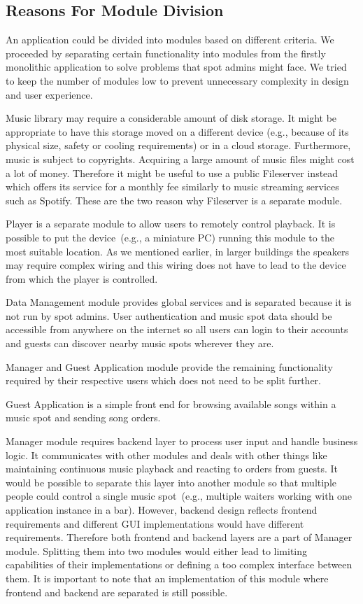 \subsection{Reasons For Module Division}

An application could be divided into modules based on different criteria. We proceeded by separating certain functionality into modules from the firstly monolithic application to solve problems that spot admins might face. We tried to keep the number of modules low to prevent unnecessary complexity in design and user experience.
\par
Music library may require a considerable amount of disk storage. It might be appropriate to have this storage moved on a different device (e.g., because of its physical size, safety or cooling requirements) or in a cloud storage. Furthermore, music is subject to copyrights. Acquiring a large amount of music files might cost a lot of money. Therefore it might be useful to use a public Fileserver instead which offers its service for a monthly fee similarly to music streaming services such as Spotify. These are the two reason why Fileserver is a separate module.
\par
Player is a separate module to allow users to remotely control playback. It is possible to put the device~(e.g., a miniature PC) running this module to the most suitable location. As we mentioned earlier, in larger buildings the speakers may require complex wiring and this wiring does not have to lead to the device from which the player is controlled.
\par
Data Management module provides global services and is separated because it is not run by spot admins. User authentication and music spot data should be accessible from anywhere on the internet so all users can login to their accounts and guests can discover nearby music spots wherever they are.
\par
Manager and Guest Application module provide the remaining functionality required by their respective users which does not need to be split further.
\par
Guest Application is a simple front end for browsing available songs within a music spot and sending song orders.
\par
Manager module requires backend layer to process user input and handle business logic. It communicates with other modules and deals with other things like maintaining continuous music playback and reacting to orders from guests. It would be possible to separate this layer into another module so that multiple people could control a single music spot~(e.g., multiple waiters working with one application instance in a bar). However, backend design reflects frontend requirements and different GUI implementations would have different requirements. Therefore both frontend and backend layers are a part of Manager module. Splitting them into two modules would either lead to limiting capabilities of their implementations or defining a too complex interface between them. It is important to note that an implementation of this module where frontend and backend are separated is still possible.

